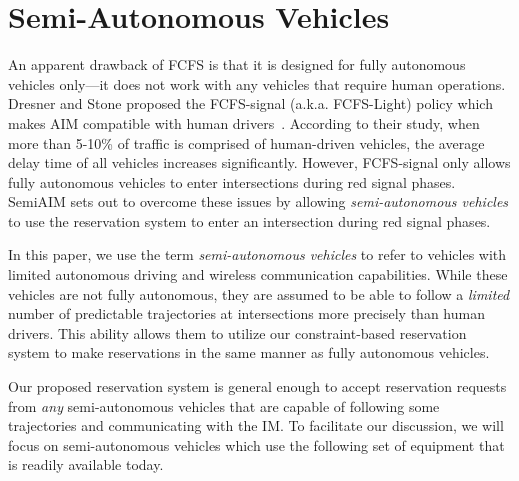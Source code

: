 \section{Semi-Autonomous Vehicles}
\label{sec:vehicles}

An apparent drawback of FCFS is that it is designed for fully autonomous
vehicles only---it does not work with any vehicles that require human
operations.
Dresner and Stone proposed the FCFS-signal (a.k.a. FCFS-Light) policy which makes AIM
compatible with human drivers~\cite{bib:Dresner07Sharing}. According
to their study, when more than 5-10\% of traffic is comprised of
human-driven vehicles, the average delay time of all vehicles
increases significantly.
However, FCFS-signal only allows fully autonomous
vehicles to enter intersections during red signal phases.
SemiAIM sets out to overcome these issues by allowing
\emph{semi-autonomous vehicles} to use the reservation system
to enter an intersection during red signal phases.

In this paper, we use the term \emph{semi-autonomous vehicles} to
refer to vehicles with limited autonomous driving and wireless
communication capabilities.  While these vehicles are not fully
autonomous, they are assumed to be able to follow a \emph{limited}
number of predictable trajectories at intersections more precisely
than human drivers.  This ability allows them to utilize our
constraint-based reservation system to make reservations in the same
manner as fully autonomous vehicles.

Our proposed reservation system is general enough to accept
reservation requests from \emph{any} semi-autonomous vehicles that are
capable of following some trajectories and communicating with the IM.
To facilitate our discussion, we will focus on semi-autonomous
vehicles which use the following set of equipment that is readily
available today.

